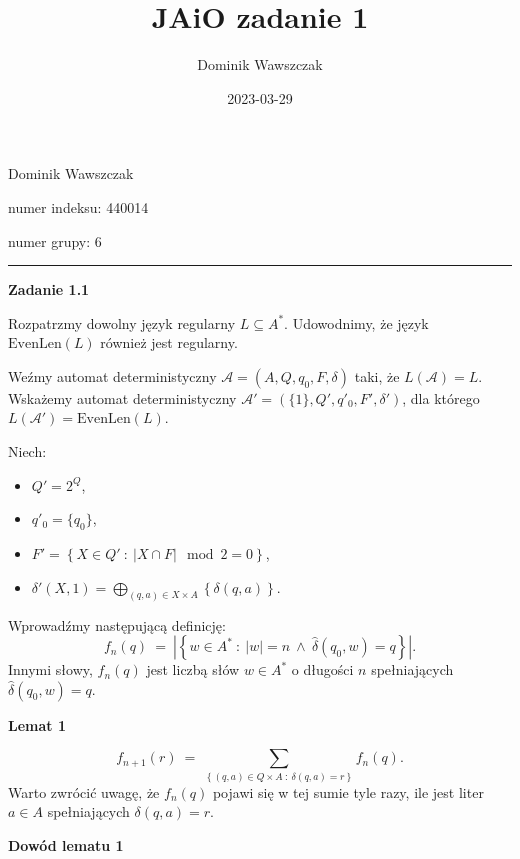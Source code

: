 \documentclass[12pt]{article}
\title{JAiO zadanie 1}
\author{Dominik Wawszczak}
\date{2023-03-29}
\begin{document}
	\setlength{\parindent}{0 cm}
	
	Dominik Wawszczak
	
	numer indeksu: 440014
	
	numer grupy: 6
	
	\bigskip
	\hrule
	\bigskip
	
	\textbf{Zadanie 1.1}
	
	\medskip
	
	Rozpatrzmy dowolny język regularny \(L \subseteq A^{\ast}\). Udowodnimy, że
	język \(\text{EvenLen}(L)\) również jest regularny.
	
	\medskip
	
	Weźmy automat deterministyczny \(\mathcal{A} = \left( A, Q, q_0, F, \delta
	\right)\) taki, że \(L(\mathcal{A}) = L\). Wskażemy automat deterministyczny
	\(\mathcal{A}' = \left( \{1\}, Q', q'_{0}, F', \delta' \right)\), dla
	którego \(L \left( \mathcal{A}' \right) = \text{EvenLen}(L)\).
	
	\medskip
	
	Niech:
	\begin{itemize}
		\item \(Q' = 2^{Q}\),
		\item \(q'_{0} = \{q_0\}\),
		\item \(F' = \left\{ X \in Q' \ : \ |X \cap F| \mod 2 = 0
		      \right\}\),
		\item \(\delta'(X, 1) = \bigoplus\limits_{(q, a) \in X \times A}
		      \left\{ \delta(q, a) \right\} \).
	\end{itemize}
	
	\medskip
	
	Wprowadźmy następującą definicję:
	\[ f_{n} (q) \ = \ \left| \left\{ w \in A^{\ast} \ : \ |w| = n \ \wedge \
	\hat{\delta} \left( q_0, w \right) = q \right\} \right| \text{.} \]
	Innymi słowy, \(f_{n} (q)\) jest liczbą słów \(w \in A^{\ast}\) o długości
	\(n\) spełniających \(\hat{\delta} \left( q_0, w \right) = q\).
	
	\medskip
	
	\textbf{Lemat 1}
	
	\[ f_{n + 1} (r) \ = \ \sum\limits_{\left\{ (q, a) \in Q \times A \ : \
	\delta (q, a) = r \right\}} f_{n} (q) \text{.} \]
	Warto zwrócić uwagę, że \(f_{n} (q)\) pojawi się w tej sumie tyle razy, ile
	jest liter \(a \in A\) spełniających \(\delta (q, a) = r\).
	
	\medskip
	
	\textbf{Dowód lematu 1}
	
	\medskip
	
\end{document}
